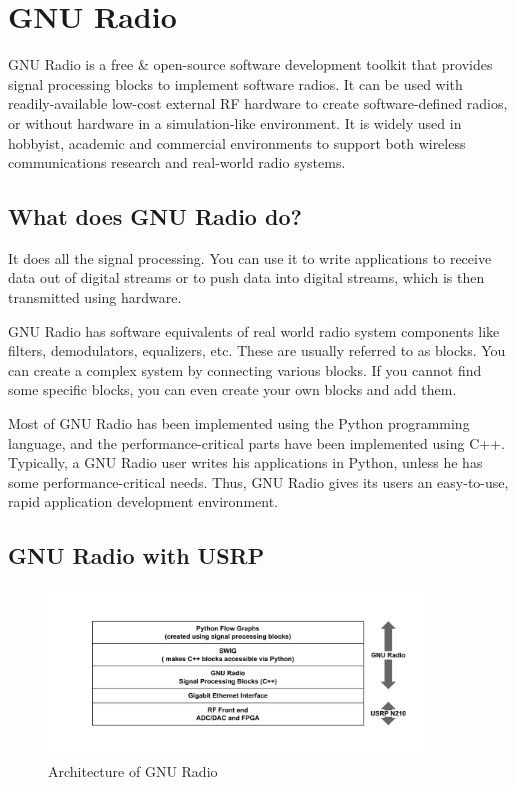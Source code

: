 \section{GNU Radio}

GNU Radio is a free \& open-source software development toolkit that provides 
signal processing blocks to implement software radios. It can be used with 
readily-available low-cost external RF hardware to create software-defined 
radios, or without hardware in a simulation-like environment. It is widely 
used in hobbyist, academic and commercial environments to support both 
wireless communications research and real-world radio systems.

\subsection{What does GNU Radio do?}
It does all the signal processing. You can use it to write applications to 
receive data out of digital streams or to push data into digital streams, 
which is then transmitted using hardware.

GNU Radio has software equivalents of real world radio system components like 
filters, demodulators, equalizers, etc. These are usually referred to as
blocks. You can create a complex system by connecting various blocks. If you
cannot find some specific blocks, you can even create your own blocks and add
them.

Most of GNU Radio has been implemented using the Python programming language,
and the performance-critical parts have been implemented using C++. Typically,
a GNU Radio user writes his applications in Python, unless he has some
performance-critical needs. Thus, GNU Radio gives its users an easy-to-use,
rapid application development environment.

\subsection{GNU Radio with USRP}

\begin{figure}[h]
\centering
\includegraphics[width=0.9\textwidth]{gnuradio_architecture}
\caption{Architecture of GNU Radio}
\label{gnuradio_architecture}
\end{figure}

